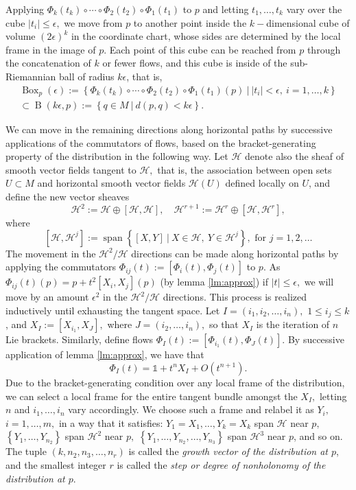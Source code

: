 \documentclass[12pt, letterpaper, reqno]{amsart}
\theoremstyle{definition}
\theoremstyle{plain}
\theoremstyle{remark}
\begin{document}
Applying $ \Phi_k(t_k)\circ\cdots\circ \Phi_2(t_2)\circ\Phi_1(t_1)$ to $ p $ and letting $ t_1,\dots,t_k $ vary over the cube $ |t_i|\leq\epsilon, $ we move from $ p $ to another point inside the $ k- $dimensional  cube of volume $ (2\epsilon)^k$ in the coordinate chart, whose sides are determined by the local frame in the image of $ p $. Each point of this cube can be reached from $ p $ through the concatenation of $ k $ or fewer flows, and this cube is inside of the sub-Riemannian ball of radius $ k\epsilon $, that is,
\begin{align*}
 \operatorname{Box}_p(\epsilon):= \left\{ \Phi_k(t_k)\circ\cdots\circ \Phi_2(t_2)\circ\Phi_1(t_1)(p) \ | \ |t_i|<\epsilon, \ i=1,\dots,k \right\}\\ \subset \operatorname{B}(k\epsilon, p):= \left\{ q\in M \ | \ d(p,q)<k\epsilon \right\}.  
\end{align*}

We can move in the remaining directions along horizontal paths by successive applications of the commutators of flows, based on the bracket-generating property of the distribution in the following way. Let $ \mathcal{H} $ denote also the sheaf of smooth vector fields tangent to $ \mathcal{H}, $ that is, the association between open sets $ U\subset M $ and horizontal smooth vector fields $ \mathcal{H}(U) $ defined locally on $ U $, and define the new vector sheaves
$$ \mathcal{H}^2 := \mathcal{H}\oplus [\mathcal{H},\mathcal{H}],\quad \mathcal{H}^{r+1} := \mathcal{H}^r\oplus [\mathcal{H}, \mathcal{H}^r], $$
where
$$ \left[ \mathcal{H}, \mathcal{H}^j \right]:= \operatorname{span} \left\{ [X,Y] \ | \ X\in \mathcal{H},\ Y \in \mathcal{H}^j \right\}, \text{ for }j=1,2,\dots  $$ 
The movement in the $ \mathcal{H}^2/\mathcal{H} $ directions can be made along horizontal paths by applying the commutators $ \Phi_{ij}(t):= [\Phi_i(t),\Phi_j(t)] $ to $ p. $ As $ \Phi_{ij}(t)(p)=p+t^2[X_i, X_j](p) $ (by lemma \ref{lm:approx}) if $ |t|\leq\epsilon, $ we will move by an amount $ \epsilon^2 $ in the $ \mathcal{H}^2/\mathcal{H} $ directions. This process is realized inductively until exhausting the tangent space. Let $ I=(i_1,i_2,\dots,i_n), $ $ 1\leq i_j\leq k $, and $ X_I:=[X_{i_1}, X_J], $ where $ J=(i_2,\dots,i_n), $  so that $ X_I $ is the iteration of $ n $ Lie brackets. Similarly, define flows $ \Phi_I(t):=[\Phi_{i_1}(t), \Phi_J(t)] $. By successive application of lemma \ref{lm:approx}, we have that   
$$ \Phi_I(t)= \mathbb{1} +t^n X_I+ O(t^{n+1}).$$ 
Due to the bracket-generating condition over any local frame of the distribution, we can select a local frame for the entire tangent bundle amongst the $ X_I, $ letting $ n $ and $ i_1,\dots,i_n $ vary accordingly. We choose such a frame and relabel it as $ Y_i, $ $ i=1,\dots,m, $ in a way that it satisfies: $ Y_1=X_1,\dots, Y_k=X_k $ span $ \mathcal{H} $ near $ p, $ $ \left\{ Y_1,\dots,Y_{n_2} \right\} $ span $ \mathcal{H}^2 $ near $ p, $ $ \left\{ Y_1,\dots,Y_{n_2},\dots,Y_{n_3} \right\} $ span $ \mathcal{H}^3 $ near $ p $,  and so on. The tuple $ (k,n_2,n_3,\dots, n_r) $ is called the \textit{growth vector of the distribution at $ p $}, and the smallest integer $ r $ is called the \textit{step or degree of nonholonomy of the distribution at $ p. $ }   
\end{document}
